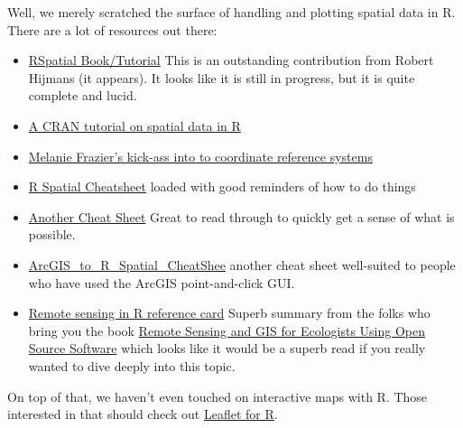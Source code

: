 \documentclass[]{book}
\providecommand{\tightlist}{%
  \setlength{\itemsep}{0pt}\setlength{\parskip}{0pt}}
\theoremstyle{definition}
\theoremstyle{definition}
\theoremstyle{remark}
\begin{document}
Well, we merely scratched the surface of handling and plotting spatial
data in R. There are a lot of resources out there:

\begin{itemize}
\tightlist
\item
  \href{http://rspatial.org/index.html}{RSpatial Book/Tutorial} This is
  an outstanding contribution from Robert Hijmans (it appears). It looks
  like it is still in progress, but it is quite complete and lucid.
\item
  \href{https://cran.r-project.org/doc/contrib/intro-spatial-rl.pdf}{A
  CRAN tutorial on spatial data in R}
\item
  \href{https://www.nceas.ucsb.edu/~frazier/RSpatialGuides/OverviewCoordinateReferenceSystems.pdf}{Melanie
  Frazier's kick-ass into to coordinate reference systems}
\item
  \href{http://www.maths.lancs.ac.uk/~rowlings/Teaching/UseR2012/cheatsheet.html}{R
  Spatial Cheatsheet} loaded with good reminders of how to do things
\item
  \href{http://www.nickeubank.com/wp-content/uploads/2015/10/gis_in_r_vector_cheatsheet.pdf}{Another
  Cheat Sheet} Great to read through to quickly get a sense of what is
  possible.
\item
  \href{http://www.seascapemodels.org/data/ArcGIS_to_R_Spatial_CheatSheet.pdf}{ArcGIS\_to\_R\_Spatial\_CheatShee}
  another cheat sheet well-suited to people who have used the ArcGIS
  point-and-click GUI.
\item
  \href{https://github.com/wegmann/RSdocs/raw/master/RSecology_cheatsheet/RS_ecology_refcard.pdf}{Remote
  sensing in R reference card} Superb summary from the folks who bring
  you the book
  \href{https://www.amazon.com/Remote-Sensing-GIS-Ecologists-Software/dp/1784270229}{Remote
  Sensing and GIS for Ecologists Using Open Source Software} which looks
  like it would be a superb read if you really wanted to dive deeply
  into this topic.
\end{itemize}

On top of that, we haven't even touched on interactive maps with R.
Those interested in that should check out
\href{https://rstudio.github.io/leaflet/}{Leaflet for R}.


\end{document}
